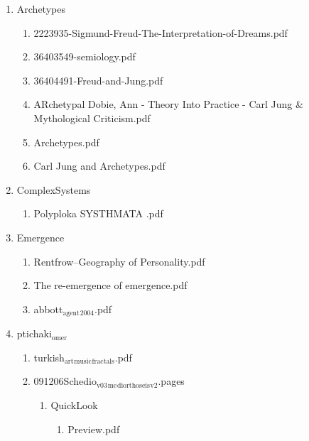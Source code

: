 \documentclass[11pt]{article}
\begin{document}
\begin{enumerate}
\item Archetypes
\label{sec-1-1-1-1-49-2-1-9}
\begin{enumerate}
\item 2223935-Sigmund-Freud-The-Interpretation-of-Dreams.pdf
\label{sec-1-1-1-1-49-2-1-9-1}

\item 36403549-semiology.pdf
\label{sec-1-1-1-1-49-2-1-9-2}

\item 36404491-Freud-and-Jung.pdf
\label{sec-1-1-1-1-49-2-1-9-3}

\item ARchetypal Dobie, Ann - Theory Into Practice - Carl Jung \& Mythological Criticism.pdf
\label{sec-1-1-1-1-49-2-1-9-4}

\item Archetypes.pdf
\label{sec-1-1-1-1-49-2-1-9-5}

\item Carl Jung and Archetypes.pdf
\label{sec-1-1-1-1-49-2-1-9-6}
\end{enumerate}

\item ComplexSystems
\label{sec-1-1-1-1-49-2-1-10}
\begin{enumerate}
\item Polyploka SYSTHMATA .pdf
\label{sec-1-1-1-1-49-2-1-10-1}
\end{enumerate}

\item Emergence
\label{sec-1-1-1-1-49-2-1-11}
\begin{enumerate}
\item Rentfrow--Geography of Personality.pdf
\label{sec-1-1-1-1-49-2-1-11-1}

\item The re-emergence of emergence.pdf
\label{sec-1-1-1-1-49-2-1-11-2}

\item abbott$_{\text{agent}}$$_{\text{2004}}$.pdf
\label{sec-1-1-1-1-49-2-1-11-3}
\end{enumerate}

\item ptichaki$_{\text{omer}}$
\label{sec-1-1-1-1-49-2-1-12}
\begin{enumerate}
\item turkish$_{\text{art}}$$_{\text{music}}$$_{\text{fractals}}$.pdf
\label{sec-1-1-1-1-49-2-1-12-1}

\item 091206Schedio$_{\text{v03}}$$_{\text{me}}$$_{\text{diorthoseis}}$$_{\text{v2}}$.pages
\label{sec-1-1-1-1-49-2-1-12-2}
\begin{enumerate}
\item QuickLook
\label{sec-1-1-1-1-49-2-1-12-2-1}
\begin{enumerate}
\item Preview.pdf
\label{sec-1-1-1-1-49-2-1-12-2-1-1}
\end{enumerate}
\end{enumerate}
\end{enumerate}
\end{enumerate}
\end{document}
